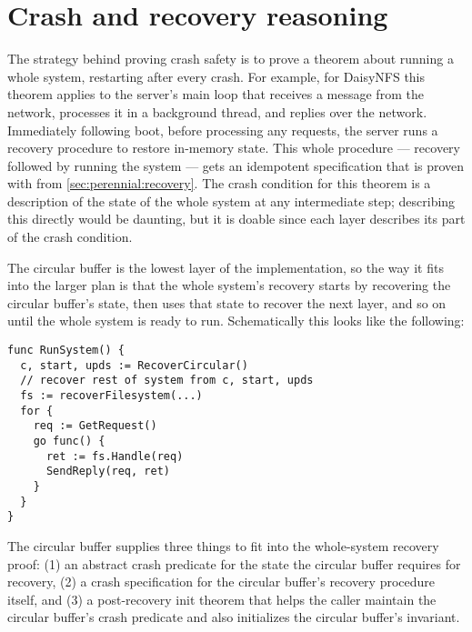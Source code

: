 \section{Crash and recovery reasoning}
\label{sec:perennial:recovery-spec}

The strategy behind proving crash safety is to prove a theorem about running a
whole system, restarting after every crash. For example, for DaisyNFS this
theorem applies to the server's main loop that receives a message from the
network, processes it in a background thread, and replies over the network.
Immediately following boot, before processing any requests, the server runs a
recovery procedure to restore in-memory state. This whole procedure --- recovery
followed by running the system --- gets an idempotent specification that is
proven with  from \cref{sec:perennial:recovery}. The
crash condition for this theorem is a description of the state of the whole
system at any intermediate step; describing this directly would be daunting, but
it is doable since each layer describes its part of the crash condition.

The circular buffer is the lowest layer of the implementation, so the way it
fits into the larger plan is that the whole system's recovery starts by
recovering the circular buffer's state, then uses that state to recover the next
layer, and so on until the whole system is ready to run. Schematically this
looks like the following:
%
\begin{verbatim}
func RunSystem() {
  c, start, upds := RecoverCircular()
  // recover rest of system from c, start, upds
  fs := recoverFilesystem(...)
  for {
    req := GetRequest()
    go func() {
      ret := fs.Handle(req)
      SendReply(req, ret)
    }
  }
}
\end{verbatim}

The circular buffer supplies three things to fit into the whole-system
recovery proof: (1) an abstract crash predicate for the state the circular
buffer requires for recovery, (2) a crash specification for the circular
buffer's recovery procedure itself, and (3) a post-recovery init theorem that
helps the caller maintain the circular buffer's crash predicate and also
initializes the circular buffer's invariant.

